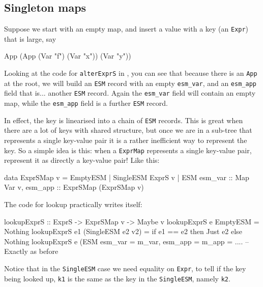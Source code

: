 \documentclass[acmsmall]{acmart}
\theoremstyle{theorem}
\theoremstyle{definition}
\theoremstyle{remark}
\begin{document}
\subsection{Singleton maps} \label{sec:singleton}

Suppose we start with an empty map, and insert a value
with a key (an \lstinline{Expr}) that is large, say
\begin{code}
  App (App (Var "f") (Var "x")) (Var "y"))
\end{code}
Looking at the code
for \lstinline{alterExprS} in , you can see that
because there is an \lstinline{App} at the root, we will build an
\lstinline{ESM} record with an empty \lstinline{esm_var}, and an
\lstinline{esm_app} field that is... another \lstinline{ESM}
record.  Again the \lstinline{esm_var} field will contain an
empty map, while the \lstinline{esm_app} field is a further \lstinline{ESM} record.

In effect, the key is linearised into a chain of \lstinline{ESM} records.
This is great when there are a lot of keys with shared structure, but
once we are in a sub-tree that represents a single key-value pair it is
a rather inefficient way to represent the key.  So a simple idea is this:
when a \lstinline{ExprMap} represents a single key-value pair, represent it
as directly a key-value pair!  Like this:
\begin{code}
data ExprSMap v = EmptyESM
                | SingleESM ExprS v
                | ESM { esm_var :: Map Var v, esm_app :: ExprSMap (ExprSMap v) }
\end{code}
The code for lookup practically writes itself:
\begin{code}
lookupExprS :: ExprS -> ExprSMap v -> Maybe v
lookupExprS e EmptyESM
  = Nothing
lookupExprS e1 (SingleESM e2 v2)
= if e1 == e2 then Just e2
              else Nothing
lookupExprS e (ESM { esm_var = m_var, esm_app = m_app }
  = ....     -- Exactly as before
\end{code}
Notice that in the \lstinline{SingleESM} case we need equality on \lstinline{Expr},
to tell if the key being looked up, \lstinline{k1} is the same as the key in
the \lstinline{SingleESM}, namely \lstinline{k2}.
\end{document}
